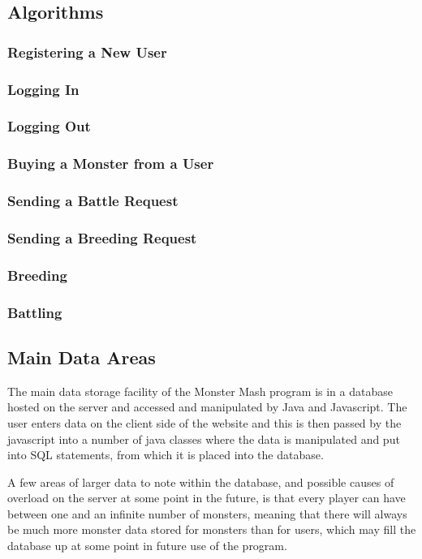 \documentclass{project}
\begin{document}
\subsection{Algorithms}
\subsubsection{Registering a New User}
\subsubsection{Logging In}
\subsubsection{Logging Out}
\subsubsection{Buying a Monster from a User}
\subsubsection{Sending a Battle Request}
\subsubsection{Sending a Breeding Request}
\subsubsection{Breeding}
\subsubsection{Battling}

\subsection{Main Data Areas}
The main data storage facility of the Monster Mash program is in a database hosted on the server and accessed and manipulated by Java and Javascript. The user enters data on the client side of the website and this is then passed by the javascript into a number of java classes where the data is manipulated and put into SQL statements, from which it is placed into the database.

A few areas of larger data to note within the database, and possible causes of overload on the server at some point in the future, is that every player can have between one and an infinite number of monsters, meaning that there will always be much more monster data stored for monsters than for users, which may fill the database up at some point in future use of the program.
\end{document}
